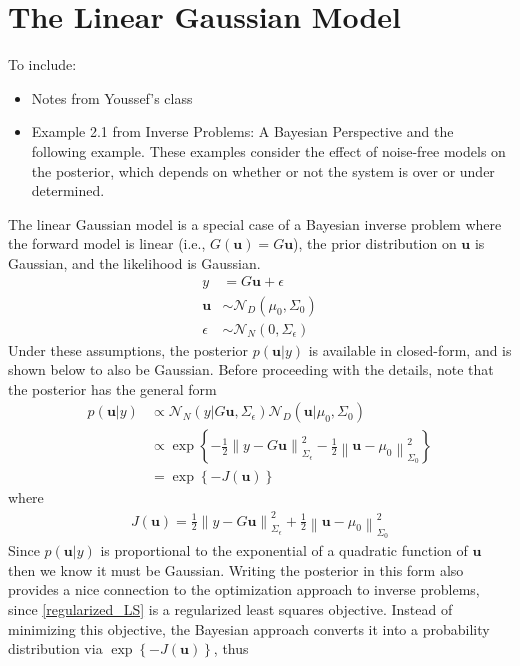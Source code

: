 \documentclass[12pt]{article}
\newcommand{\bpar}{\mathbf{u}} %
\newcommand*{\norm}[1]{\left\lVert#1\right\rVert}
\begin{document}
\section{The Linear Gaussian Model}
To include: 
\begin{itemize}
\item Notes from Youssef's class
\item Example 2.1 from Inverse Problems: A Bayesian Perspective and the following example. These examples consider the effect of noise-free models on the posterior, which depends on whether or not the system is over or under determined. 
\end{itemize}

The linear Gaussian model is a special case of a Bayesian inverse problem where the forward model is linear (i.e., $G(\bpar) = G\bpar$), the prior distribution on $\bpar$ is Gaussian, and the likelihood is Gaussian. 
\begin{align}
y &= G\bpar + \epsilon \label{linear_Gaussian} \\
\bpar &\sim \mathcal{N}_D(\mu_0, \Sigma_0) \nonumber \\
\epsilon &\sim \mathcal{N}_N(0, \Sigma_\epsilon) \nonumber
\end{align}
Under these assumptions, the posterior $p(\bpar|y)$ is available in closed-form, and is shown below to also be Gaussian. Before proceeding with the details, note that the posterior has the general form 
\begin{align*}
p(\bpar|y) &\propto \mathcal{N}_N(y|G\bpar, \Sigma_\epsilon)\mathcal{N}_D(\bpar|\mu_0, \Sigma_0) \\
		&\propto \exp\left\{-\frac{1}{2} \norm{y - G\bpar}^2_{\Sigma_\epsilon} - \frac{1}{2} \norm{\bpar - \mu_0}^2_{\Sigma_0} \right\} \\
		&= \exp\left\{-J(\bpar) \right\}
\end{align*}
where 
\begin{align} 
J(\bpar) = \frac{1}{2} \norm{y - G\bpar}^2_{\Sigma_\epsilon} + \frac{1}{2} \norm{\bpar - \mu_0}^2_{\Sigma_0} \label{regularized_LS}
\end{align}
Since $p(\bpar|y)$ is proportional to the exponential of a quadratic function of $\bpar$ then we know it must be Gaussian. Writing the posterior in this form also provides a nice connection to the optimization approach to 
inverse problems, since \ref{regularized_LS} is a regularized least squares objective. Instead of minimizing this objective, the Bayesian approach converts it into a probability distribution via $\exp\left\{-J(\bpar) \right\}$, thus 
\end{document}
